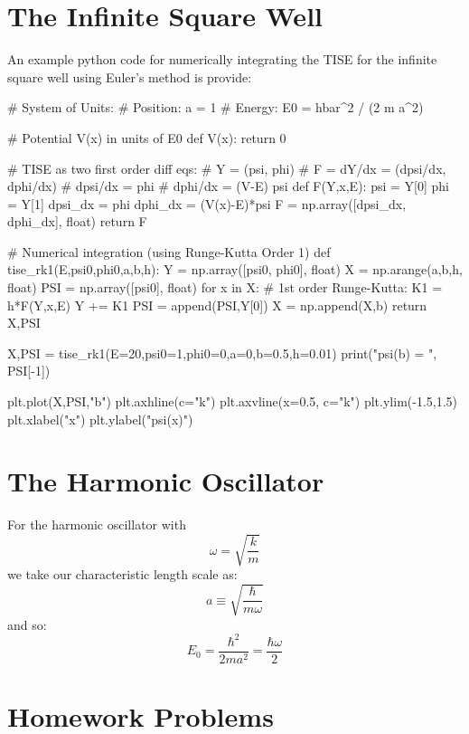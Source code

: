 \documentclass[12pt]{book}
\begin{document}
\section{The Infinite Square Well}
An example python code for numerically integrating the TISE for the infinite square well using Euler's method is provide:
\begin{python}
# System of Units:
# Position:  a = 1
# Energy:   E0 = hbar^2 / (2 m a^2)

# Potential V(x) in units of E0
def V(x):
    return 0

# TISE as two first order diff eqs:
# Y = (psi, phi)
# F = dY/dx = (dpsi/dx, dphi/dx)
# dpsi/dx = phi
# dphi/dx = (V-E) psi
def F(Y,x,E):
    psi = Y[0]
    phi = Y[1]
    dpsi_dx = phi
    dphi_dx = (V(x)-E)*psi
    F = np.array([dpsi_dx, dphi_dx], float)
    return F

# Numerical integration (using Runge-Kutta Order 1)
def tise_rk1(E,psi0,phi0,a,b,h):
    Y = np.array([psi0, phi0], float)
    X   = np.arange(a,b,h, float)
    PSI = np.array([psi0], float)
    for x in X:
        # 1st order Runge-Kutta:
        K1 = h*F(Y,x,E)
        Y += K1
        PSI = append(PSI,Y[0])
    X = np.append(X,b)
    return X,PSI

X,PSI = tise_rk1(E=20,psi0=1,phi0=0,a=0,b=0.5,h=0.01)
print("psi(b) = ", PSI[-1])

plt.plot(X,PSI,"b")
plt.axhline(c="k")
plt.axvline(x=0.5, c="k")
plt.ylim(-1.5,1.5)
plt.xlabel("x")
plt.ylabel("psi(x)")
\end{python}

\section{The Harmonic Oscillator}

For the harmonic oscillator with
\begin{equation*}
\omega = \sqrt{\frac{k}{m}}
\end{equation*}
we take our characteristic length scale as:
$$a \equiv \sqrt{\frac{\hbar}{m \omega}}$$
and so:
$$E_0 = \frac{\hbar^2}{2ma^2} = \frac{\hbar \omega}{2}$$

\section{Homework Problems}
\end{document}
